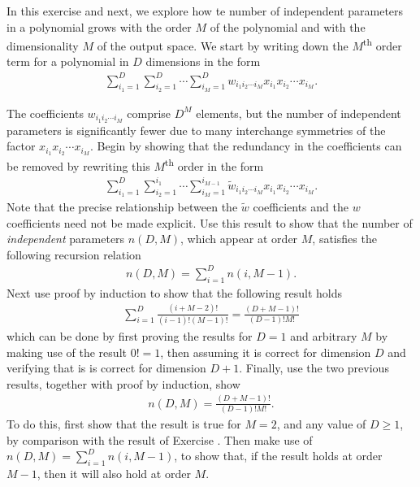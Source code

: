 \begin{question}{1.15}
	In this exercise and next, we explore how te number of independent parameters in a polynomial grows with the order $M$ of the polynomial and with the dimensionality $M$ of the output space. We start by writing down the $M$\textsuperscript{th} order term for a polynomial in $D$ dimensions in the form
	\begin{align*}
		\sum_{i_1 = 1}^{D} \sum_{i_2 = 1}^{D} \cdots \sum_{i_M = 1}^{D} w_{i_1i_2\cdots i_M} x_{i_1}x_{i_2}\cdots x_{i_M}.
	\end{align*}
	
	The coefficients $w_{i_1i_2\cdots i_M}$ comprise $D^M$ elements, but the number of independent parameters is significantly fewer due to many interchange symmetries of the factor $x_{i_1}x_{i_2}\cdots x_{i_M}$. Begin by showing that the redundancy in the coefficients can be removed by rewriting this $M$\textsuperscript{th} order in the form
	\begin{align*}
		\sum_{i_1 = 1}^{D}\sum_{i_2=1}^{i_1}\cdots \sum_{i_M=1}^{i_{M-1}} \tilde{w}_{i_1i_2\cdots i_M} x_{i_1}x_{i_2}\cdots x_{i_M}.
	\end{align*}
	Note that the precise relationship between the $\tilde{w}$ coefficients and the $w$ coefficients need not be made explicit. Use this result to show that the number of \emph{independent} parameters $n(D, M)$, which appear at order $M$, satisfies the following recursion relation
	\begin{align*}
		n(D, M) = \sum_{i = 1}^{D} n(i, M - 1).
	\end{align*}
	Next use proof by induction to show that the following result holds
	\begin{align*}
		\sum_{i = 1}^{D} \frac{(i + M - 2)!}{(i - 1)!(M - 1)!} = \frac{(D + M - 1)!}{(D-1)!M!}
	\end{align*}
	which can be done by first proving the results for $D=1$ and arbitrary $M$ by making use of the result $0!=1$, then assuming it is correct for dimension $D$ and verifying that is is correct for dimension $D+1$. Finally, use the two previous results, together with proof by induction, show
	\begin{align*}
		n(D,M) = \frac{(D + M - 1)!}{(D-1)!M!}.
	\end{align*}
	To do this, first show that the result is true for $M = 2$, and any value of $D \geq 1$, by comparison with the result of Exercise . Then make use of $n(D, M) = \sum_{i = 1}^{D} n(i, M - 1)$, to show that, if the result holds at order $M - 1$, then it will also hold at order $M$.
\end{question}

